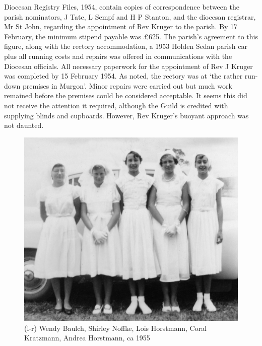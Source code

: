 Diocesan Registry Files, 1954, contain copies of correspondence between the parish nominators, J Tate, L Sempf and H P Stanton, and the diocesan registrar, Mr St John, regarding the appointment of Rev Kruger to the parish. By 17 February, the minimum stipend payable was \pounds625. The parish's agreement to this figure, along with the rectory accommodation, a 1953 Holden Sedan parish car plus all running costs and repairs was offered in communications with the Diocesan officials. All necessary paperwork for the appointment of Rev J Kruger was completed by 15 February 1954. As noted, the rectory was at `the rather run-down premises in Murgon'. Minor repairs were carried out but much work remained before the premises could be considered acceptable. It seems this did not receive the attention it required, although the Guild is credited with supplying blinds and cupboards. However, Rev Kruger's buoyant approach was not daunted.









\begin{figure}[!htb]
\begin{center}
\includegraphics[width=1.\textwidth,center]{../images/confirmation1955.jpg}
\caption{(l-r) Wendy Baulch, Shirley Noffke, Lois Horstmann, Coral Kratzmann, Andrea Horstmann, ca 1955}
\end{center}
\end{figure}




